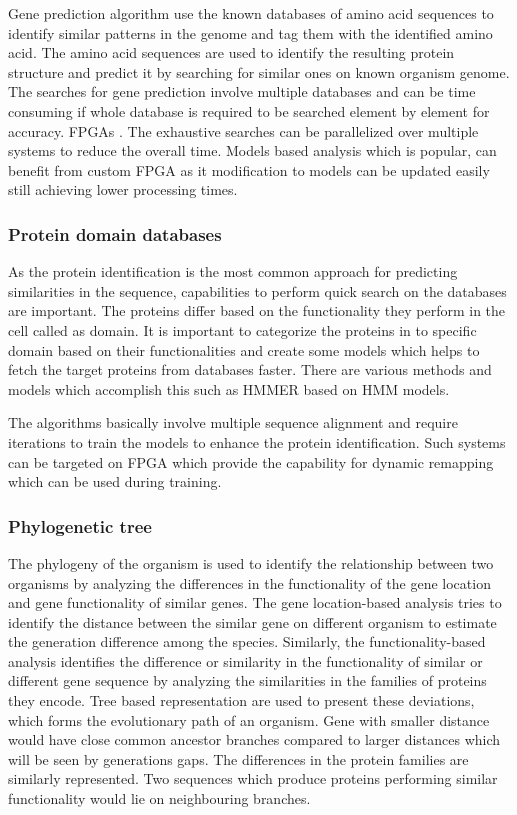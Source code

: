 \documentclass[12pt,twoside]{article}
\begin{document}
Gene prediction algorithm use the known databases of amino acid sequences to identify similar patterns
in the genome and tag them with the identified amino acid. The amino acid sequences are used to identify
the resulting protein structure and predict it by searching for similar ones on known organism genome. The searches
for gene prediction involve multiple databases and can be time consuming if whole database is required to be
searched element by element for accuracy. FPGAs . The exhaustive searches can be parallelized over multiple systems
to reduce the overall time. Models based analysis which is popular, can benefit from custom FPGA as it modification to
models can be updated easily still achieving lower processing times.

\subsubsection{Protein domain databases}

As the protein identification is the most common approach for predicting similarities in the sequence, capabilities
to perform quick search on the databases are important. The proteins differ based on the functionality they perform in
the cell called as domain. It is important to categorize the proteins in to specific domain based on their functionalities
and create some models which helps to fetch the target proteins from databases faster. There are various methods and models
which accomplish this such as HMMER based on HMM models.

The algorithms basically involve multiple sequence alignment and require iterations to train the models to enhance
the protein identification. Such systems can be targeted on FPGA which provide the capability for dynamic remapping
which can be used during training.

\subsubsection{Phylogenetic tree}

The phylogeny of the organism is used to identify the relationship between two organisms by analyzing the differences in the
functionality of the gene location and gene functionality of similar genes. The gene location-based analysis tries
to identify the distance between the similar gene on different organism to estimate the generation difference among the
species. Similarly, the functionality-based analysis identifies the difference or similarity in the functionality of
similar or different gene sequence by analyzing the similarities in the families of proteins they encode.
Tree based representation are used to present these deviations, which forms the evolutionary path of an organism. Gene with
smaller distance would have close common ancestor branches compared to larger distances which will be seen by generations gaps.
The differences in the protein families are similarly represented. Two sequences which produce proteins performing similar
functionality would lie on neighbouring branches.
\end{document}
